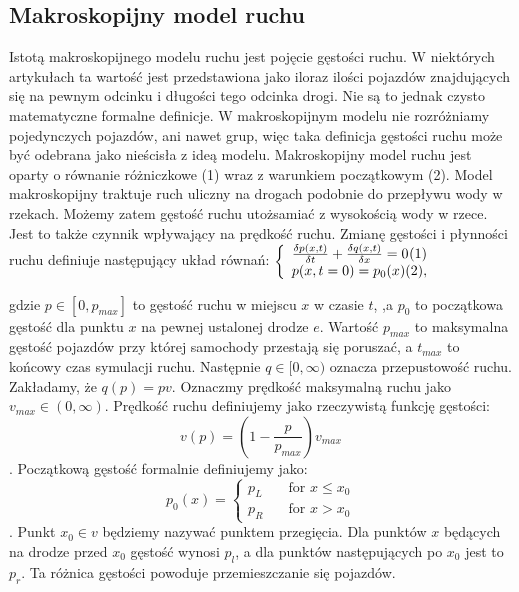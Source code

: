 \documentclass[11pt]{IEEEtran}
\begin{document}
\subsection{Makroskopijny model ruchu} 
Istotą makroskopijnego modelu ruchu jest pojęcie gęstości ruchu. W niektórych artykułach \cite{helbing2001master} ta wartość jest przedstawiona jako iloraz ilości pojazdów znajdujących się na pewnym odcinku i długości tego odcinka drogi. Nie są to jednak czysto matematyczne formalne definicje. W makroskopijnym modelu nie rozróżniamy pojedynczych pojazdów, ani nawet grup, więc taka definicja gęstości ruchu może być odebrana jako nieścisła z ideą modelu. 
Makroskopijny model ruchu jest oparty o równanie różniczkowe (1) wraz z warunkiem początkowym (2).  Model makroskopijny traktuje ruch uliczny na drogach podobnie do przepływu wody w rzekach. Możemy zatem gęstość ruchu utożsamiać z wysokością wody w rzece. Jest to także czynnik wpływający na prędkość ruchu. Zmianę gęstości i płynności ruchu definiuje następujący układ równań:
\begin{math}
  \left\{
    \begin{array}{l}
      \frac{\delta p(x,t)}{\delta t}+\frac{\delta q(x,t)}{\delta x}=0 \hspace*{0pt}\hfill (1)\\
      p(x,t=0)=p_{0}(x) \hspace*{0pt}\hfill (2),
    \end{array}
  \right.
\end{math}

gdzie $p\in[0,p_{max}]$ to gęstość ruchu w miejscu $x$ w czasie $t$, ,a $p_{0}$ to początkowa gęstość dla punktu $x$ na pewnej ustalonej drodze $e$. Wartość $p_{max}$ to maksymalna gęstość pojazdów przy której samochody przestają się poruszać, a $t_{max}$ to końcowy czas symulacji ruchu. Następnie $q\in{[0,\infty)}$ oznacza przepustowość ruchu. Zakładamy, że $q(p)=pv$.
Oznaczmy prędkość maksymalną ruchu jako $v_{max} \in(0,\infty)$. Prędkość ruchu definiujemy jako rzeczywistą funkcję gęstości: $$v(p)=(1-\frac{p}{p_{max}})v_{max}$$. Początkową gęstość formalnie definiujemy jako:
\[ p_0(x) =
  \begin{cases}
    p_L       & \quad \text{for } x\leq x_0 \\
    p_R  & \quad \text{for } x>x_0
  \end{cases}
\].
Punkt $x_0 \in v$ będziemy nazywać punktem przegięcia. Dla punktów $x$ będących na drodze przed $x_0$ gęstość wynosi $p_l$, a dla punktów następujących po $x_0$ jest to $p_r$. Ta różnica gęstości powoduje przemieszczanie się pojazdów.
\end{document}
